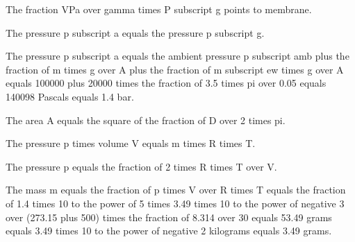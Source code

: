 The fraction VPa over gamma times P subscript g points to membrane.

The pressure p subscript a equals the pressure p subscript g.

The pressure p subscript a equals the ambient pressure p subscript amb plus the fraction of m times g over A plus the fraction of m subscript ew times g over A equals 100000 plus 20000 times the fraction of 3.5 times pi over 0.05 equals 140098 Pascals equals 1.4 bar.

The area A equals the square of the fraction of D over 2 times pi.

The pressure p times volume V equals m times R times T.

The pressure p equals the fraction of 2 times R times T over V.

The mass m equals the fraction of p times V over R times T equals the fraction of 1.4 times 10 to the power of 5 times 3.49 times 10 to the power of negative 3 over (273.15 plus 500) times the fraction of 8.314 over 30 equals 53.49 grams equals 3.49 times 10 to the power of negative 2 kilograms equals 3.49 grams.